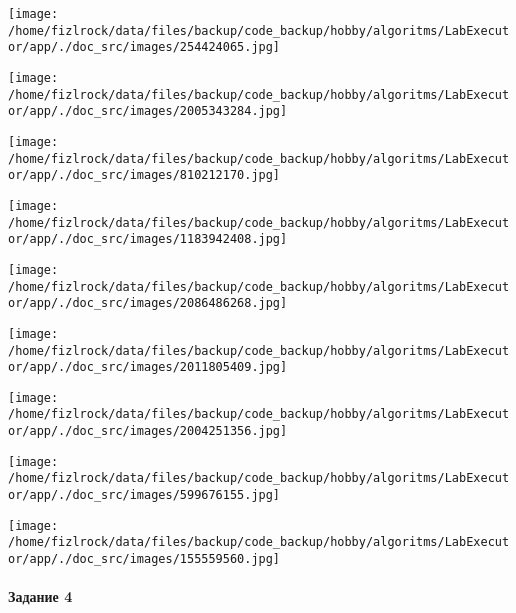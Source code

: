\documentclass[a4paper, 12pt]{article}
\begin{document}
\texttt{[image: /home/fizlrock/data/files/backup/code\_backup/hobby/algoritms/LabExecutor/app/./doc\_src/images/254424065.jpg]}

\texttt{[image: /home/fizlrock/data/files/backup/code\_backup/hobby/algoritms/LabExecutor/app/./doc\_src/images/2005343284.jpg]}

\texttt{[image: /home/fizlrock/data/files/backup/code\_backup/hobby/algoritms/LabExecutor/app/./doc\_src/images/810212170.jpg]}

\texttt{[image: /home/fizlrock/data/files/backup/code\_backup/hobby/algoritms/LabExecutor/app/./doc\_src/images/1183942408.jpg]}

\texttt{[image: /home/fizlrock/data/files/backup/code\_backup/hobby/algoritms/LabExecutor/app/./doc\_src/images/2086486268.jpg]}

\texttt{[image: /home/fizlrock/data/files/backup/code\_backup/hobby/algoritms/LabExecutor/app/./doc\_src/images/2011805409.jpg]}

\texttt{[image: /home/fizlrock/data/files/backup/code\_backup/hobby/algoritms/LabExecutor/app/./doc\_src/images/2004251356.jpg]}

\texttt{[image: /home/fizlrock/data/files/backup/code\_backup/hobby/algoritms/LabExecutor/app/./doc\_src/images/599676155.jpg]}

\texttt{[image: /home/fizlrock/data/files/backup/code\_backup/hobby/algoritms/LabExecutor/app/./doc\_src/images/155559560.jpg]}
\pagebreak
\paragraph{Задание 4}
\end{document}
